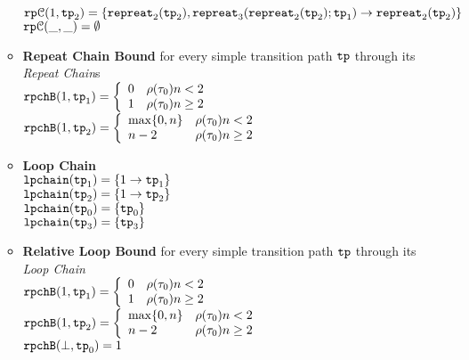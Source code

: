 \begin{enumerate}
\begin{itemize}
      \\
      $\mathtt{rp}\mathcal{C}(1, \mathtt{tp}_2) = \{\mathtt{repreat}_2(\mathtt{tp}_2), \mathtt{repreat}_3(\mathtt{repreat}_2(\mathtt{tp}_2); \mathtt{tp}_1) \to \mathtt{repreat}_2(\mathtt{tp}_2)\}$ \\
      $\mathtt{rp}\mathcal{C}(\_, \_) = \emptyset$ 
      \item \textbf{Repeat Chain Bound} for every simple transition path $\mathtt{tp}$ through its \emph{Repeat Chain}s
      \\
      $\rpchB(1, \tpath_1) = 
      \left\{
        \begin{array}{ll}
        0 & \env(\trace_0)  n < 2 \\
        1 & \env(\trace_0)  n \geq 2
        \end{array} 
      \right.$
      \\
      $\rpchB(1, \tpath_2) =     
      \left\{
        \begin{array}{ll}
        \max\{0, n\} & \env(\trace_0) n < 2 \\
        n - 2 & \env(\trace_0)  n \geq 2
        \end{array} 
      \right.$
      \item \textbf{Loop Chain}
      \\
      $\mathtt{lpchain}(\mathtt{tp}_1) = \{1\to \mathtt{tp}_1\}$ \\
      $\mathtt{lpchain}(\mathtt{tp}_2) = \{1\to \mathtt{tp}_2\}$ \\
      $\mathtt{lpchain}(\mathtt{tp}_0) = \{\mathtt{tp}_0\}$ \\
      $\mathtt{lpchain}(\mathtt{tp}_3) = \{\mathtt{tp}_3\}$ 
      \item \textbf{{Relative Loop Bound}} for every simple transition path $\mathtt{tp}$ through its \emph{Loop Chain}
      \\
      $\rpchB(1, \tpath_1) =       
      \left\{
        \begin{array}{ll}
        0 & \env(\trace_0)  n < 2 \\
        1 & \env(\trace_0)  n \geq 2
        \end{array} 
      \right.$
      \\
      $\rpchB(1, \tpath_2) = 
      \left\{
        \begin{array}{ll}
        \max\{0, n\} & \env(\trace_0) n < 2 \\
        n - 2 & \env(\trace_0)  n \geq 2
        \end{array} 
      \right.$
       \\
      $\mathtt{rpchB}(\bot, \mathtt{tp}_0) = 1$ \\

\end{itemize}
\end{enumerate}
